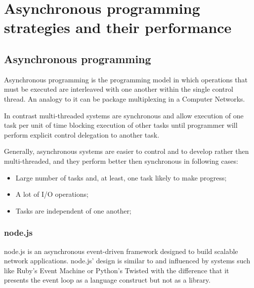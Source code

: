  \chapter{Asynchronous programming strategies and their performance}
 \label{chap:async}
\section{Asynchronous programming}
\label{sec:async}
Asynchronous programming is the programming model in which operations that must be executed are interleaved with one another within the single control thread. An analogy to it can be package multiplexing in a Computer Networks. 

In contrast multi-threaded systems are synchronous and allow execution of one task per unit of time blocking execution of other tasks until programmer will perform explicit control delegation to another task.

Generally, asynchronous systems are easier to control and to develop rather then multi-threaded, and  they perform better then synchronous in following cases\cite{asyncArticle}:
 \begin{itemize}
	\item Large number of tasks and, at least, one task likely to make progress;
	\item A lot of I/O operations;
	\item Tasks are independent of one another;
 \end{itemize}



\subsection{node.js}
\label{subsec:node}
node.js is an asynchronous event-driven framework designed to build scalable network applications.
node.js' design is similar to and influenced by systems such like Ruby's Event Machine or Python's Twisted with the difference that it presents the event loop as a language construct but not as a library\cite{nodejsabout}.

